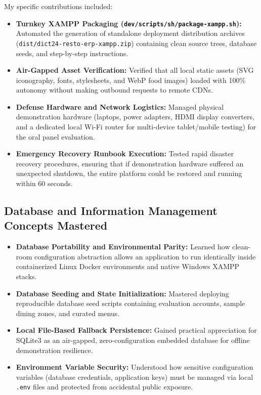 My specific contributions included:
\begin{itemize}
    \item \textbf{Turnkey XAMPP Packaging (\texttt{dev/scripts/sh/package-xampp.sh}):} Automated the generation of standalone deployment distribution archives (\texttt{dist/dict24-resto-erp-xampp.zip}) containing clean source trees, database seeds, and step-by-step instructions.
    \item \textbf{Air-Gapped Asset Verification:} Verified that all local static assets (SVG iconography, fonts, stylesheets, and WebP food images) loaded with 100\% autonomy without making outbound requests to remote CDNs.
    \item \textbf{Defense Hardware and Network Logistics:} Managed physical demonstration hardware (laptops, power adapters, HDMI display converters, and a dedicated local Wi-Fi router for multi-device tablet/mobile testing) for the oral panel evaluation.
    \item \textbf{Emergency Recovery Runbook Execution:} Tested rapid disaster recovery procedures, ensuring that if demonstration hardware suffered an unexpected shutdown, the entire platform could be restored and running within 60 seconds.
\end{itemize}

\subsection{Database and Information Management Concepts Mastered}
\begin{itemize}
    \item \textbf{Database Portability and Environmental Parity:} Learned how clean-room configuration abstraction allows an application to run identically inside containerized Linux Docker environments and native Windows XAMPP stacks.
    \item \textbf{Database Seeding and State Initialization:} Mastered deploying reproducible database seed scripts containing evaluation accounts, sample dining zones, and curated menus.
    \item \textbf{Local File-Based Fallback Persistence:} Gained practical appreciation for SQLite3 as an air-gapped, zero-configuration embedded database for offline demonstration resilience.
    \item \textbf{Environment Variable Security:} Understood how sensitive configuration variables (database credentials, application keys) must be managed via local \texttt{.env} files and protected from accidental public exposure.
\end{itemize}

